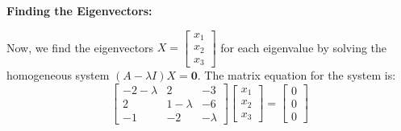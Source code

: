 \documentclass{article}
\begin{document}
\textbf{Finding the Eigenvectors:}

Now, we find the eigenvectors $X = \begin{bmatrix} x_1 \\ x_2 \\ x_3 \end{bmatrix}$ for each eigenvalue by solving the homogeneous system $(A - \lambda I) X = \mathbf{0}$. The matrix equation for the system is:
\[ \begin{bmatrix} -2 - \lambda & 2 & -3 \\ 2 & 1 - \lambda & -6 \\ -1 & -2 & -\lambda \end{bmatrix} \begin{bmatrix} x_1 \\ x_2 \\ x_3 \end{bmatrix} = \begin{bmatrix} 0 \\ 0 \\ 0 \end{bmatrix} \]
\end{document}
